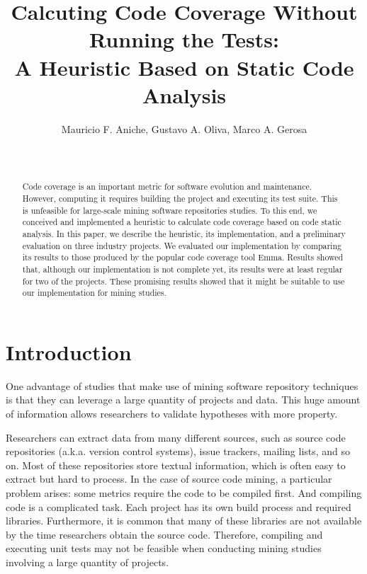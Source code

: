 \documentclass{sig-alternate}
\begin{document}

\title{Calcuting Code Coverage Without Running the Tests:\\
A Heuristic Based on Static Code Analysis}

\author{
\alignauthor
Mauricio F. Aniche, Gustavo A. Oliva, Marco A. Gerosa\\
\\
\\
}

\maketitle
\begin{abstract}

Code coverage is an important metric for software evolution and maintenance.
However, computing it requires building the project and executing its test suite.
This is unfeasible for large-scale mining software repositories studies. To this end,
we conceived and implemented a heuristic to calculate code coverage based on 
code static analysis. In this paper, we describe the heuristic, its implementation, 
and a preliminary evaluation on three industry projects. We evaluated our implementation by 
comparing its results to those produced by the popular code coverage tool Emma. Results showed that, 
although our implementation is not complete yet, its results were at least regular for two of the projects. 
These promising results showed that it might be suitable to use our implementation for mining studies.


\end{abstract}

\section{Introduction}
\label{sec:intro}

One advantage of studies that make use of mining software repository techniques
is that they can leverage a large quantity of projects and data. This huge
amount of information allows researchers to validate hypotheses with more property.

Researchers can extract data from many different sources, 
such as source code repositories (a.k.a. version control systems), 
issue trackers, mailing lists, and so on. Most of these repositories 
store textual information, which is often easy to extract but hard to process. 
In the case of source code mining, a particular problem arises: some metrics 
require the code to be compiled first. And compiling code is a complicated task. 
Each project has its own build process and required libraries. Furthermore, 
it is common that many of these libraries are not available by the time 
researchers obtain the source code. Therefore, compiling and executing 
unit tests may not be feasible when conducting mining studies involving a large
quantity of projects.
\end{document}
